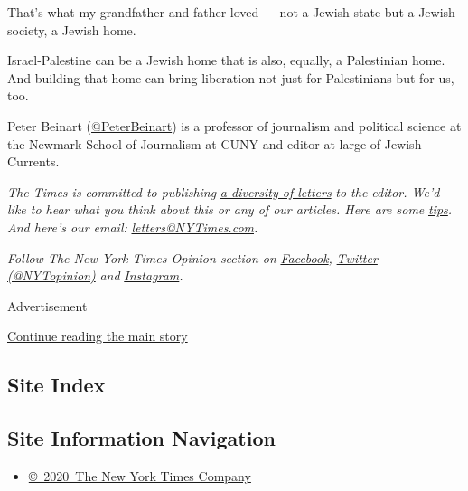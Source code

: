That's what my grandfather and father loved --- not a Jewish state but a
Jewish society, a Jewish home.

Israel-Palestine can be a Jewish home that is also, equally, a
Palestinian home. And building that home can bring liberation not just
for Palestinians but for us, too.

Peter Beinart (\href{https://twitter.com/PeterBeinart}{@PeterBeinart})
is a professor of journalism and political science at the Newmark School
of Journalism at CUNY and editor at large of Jewish Currents.

\emph{The Times is committed to publishing}
\href{https://www.nytimes3xbfgragh.onion/2019/01/31/opinion/letters/letters-to-editor-new-york-times-women.html}{\emph{a
diversity of letters}} \emph{to the editor. We'd like to hear what you
think about this or any of our articles. Here are some}
\href{https://help.nytimes3xbfgragh.onion/hc/en-us/articles/115014925288-How-to-submit-a-letter-to-the-editor}{\emph{tips}}\emph{.
And here's our email:}
\href{mailto:letters@NYTimes.com}{\emph{letters@NYTimes.com}}\emph{.}

\emph{Follow The New York Times Opinion section on}
\href{https://www.facebookcorewwwi.onion/nytopinion}{\emph{Facebook}}\emph{,}
\href{http://twitter.com/NYTOpinion}{\emph{Twitter (@NYTopinion)}}
\emph{and}
\href{https://www.instagram.com/nytopinion/}{\emph{Instagram}}\emph{.}

Advertisement

\protect\hyperlink{after-bottom}{Continue reading the main story}

\hypertarget{site-index}{%
\subsection{Site Index}\label{site-index}}

\hypertarget{site-information-navigation}{%
\subsection{Site Information
Navigation}\label{site-information-navigation}}

\begin{itemize}
\tightlist
\item
  \href{https://help.nytimes3xbfgragh.onion/hc/en-us/articles/115014792127-Copyright-notice}{©~2020~The
  New York Times Company}
\end{itemize}


